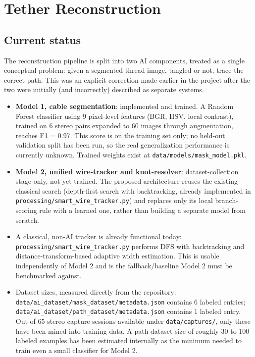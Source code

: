\chapter{Tether Reconstruction}
\label{chap:tether-reconstruction}

\section{Current status}

The reconstruction pipeline is split into two AI components, treated as a single conceptual problem: given a segmented thread image, tangled or not, trace the correct path. This was an explicit correction made earlier in the project after the two were initially (and incorrectly) described as separate systems.

\begin{itemize}
    \item \textbf{Model 1, cable segmentation}: implemented and trained. A Random Forest classifier using 9 pixel-level features (BGR, HSV, local contrast), trained on 6 stereo pairs expanded to 60 images through augmentation, reaches F1 = 0.97. This score is on the training set only; no held-out validation split has been run, so the real generalization performance is currently unknown. Trained weights exist at \texttt{data/models/mask\_model.pkl}.
    \item \textbf{Model 2, unified wire-tracker and knot-resolver}: dataset-collection stage only, not yet trained. The proposed architecture reuses the existing classical search (depth-first search with backtracking, already implemented in \texttt{processing/smart\_wire\_tracker.py}) and replaces only its local branch-scoring rule with a learned one, rather than building a separate model from scratch.
    \item A classical, non-AI tracker is already functional today: \texttt{processing/smart\_wire\_tracker.py} performs DFS with backtracking and distance-transform-based adaptive width estimation. This is usable independently of Model 2 and is the fallback/baseline Model 2 must be benchmarked against.
    \item Dataset sizes, measured directly from the repository: \texttt{data/ai\_dataset/mask\_dataset/metadata.json} contains 6 labeled entries; \texttt{data/ai\_dataset/path\_dataset/metadata.json} contains 1 labeled entry. Out of 65 stereo capture sessions available under \texttt{data/captures/}, only these have been mined into training data. A path-dataset size of roughly 30 to 100 labeled examples has been estimated internally as the minimum needed to train even a small classifier for Model 2.
\end{itemize}

